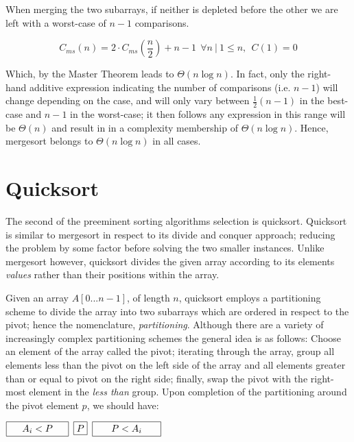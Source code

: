 \documentclass[11pt,letterpaper]{report}
\begin{document}
When merging the two subarrays, if neither is depleted before the other we are left with a worst-case of $n-1$ comparisons. 

\begin{equation} 
C_{ms}(n)=2 \cdot C_{ms}(\frac{n}{2})+n-1 \ \ \forall n~ | \ 1 \leq n, \ \ C(1) = 0 
\end{equation}

Which, by the Master Theorem leads to $\Theta(n\log{}n)$. In fact, only the right-hand additive expression indicating the number of comparisons (i.e. $n-1$) will change depending on the case, and will only vary between $\frac{1}{2}(n-1)$ in the best-case and $n-1$ in the worst-case; it then follows any expression in this range will be $\Theta(n)$ and result in in a complexity membership of $\Theta(n\log{}n)$. Hence, mergesort belongs to $\Theta(n\log{}n)$ in all cases.


\section*{Quicksort}			%
The second of the preeminent sorting algorithms selection is quicksort. Quicksort is similar to mergesort in respect to its divide and conquer approach; reducing the problem by some factor before solving the two smaller instances. Unlike mergesort however, quicksort divides the given array according to its elements \emph{values} rather than their positions within the array.

Given an array $A[0...n-1]$, of length $n$, quicksort employs a partitioning scheme to divide the array into two subarrays which are ordered in respect to the pivot; hence the nomenclature, \emph{partitioning}. Although there are a variety of increasingly complex partitioning schemes the general idea is as follows:
Choose an element of the array called the pivot; iterating through the array, group all elements less than the pivot on the left side of the array and all elements greater than or equal to pivot on the right side; finally, swap the pivot with the right-most element in the \emph{less than} group. Upon completion of the partitioning around the pivot element $p$, we should have:

\begin{center}
  \newcommand{\sep}{\hspace*{.5em}}
  $ \fbox{$\ \ \ \  A_i  < P \ \ \ \ $} \sep \fbox{$P$} \sep \fbox{  $ \ \ \ \  P < A_i  \ \ \ \ $    } $
\end{center}
\end{document}
